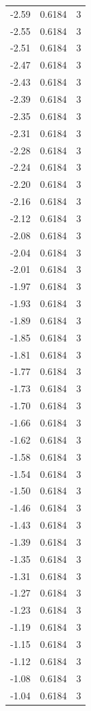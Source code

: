 \begin{longtable}{lrr}
  -2.59 & 0.6184 & 3 \\
  -2.55 & 0.6184 & 3 \\
  -2.51 & 0.6184 & 3 \\
  -2.47 & 0.6184 & 3 \\
  -2.43 & 0.6184 & 3 \\
  -2.39 & 0.6184 & 3 \\
  -2.35 & 0.6184 & 3 \\
  -2.31 & 0.6184 & 3 \\
  -2.28 & 0.6184 & 3 \\
  -2.24 & 0.6184 & 3 \\
  -2.20 & 0.6184 & 3 \\
  -2.16 & 0.6184 & 3 \\
  -2.12 & 0.6184 & 3 \\
  -2.08 & 0.6184 & 3 \\
  -2.04 & 0.6184 & 3 \\
  -2.01 & 0.6184 & 3 \\
  -1.97 & 0.6184 & 3 \\
  -1.93 & 0.6184 & 3 \\
  -1.89 & 0.6184 & 3 \\
  -1.85 & 0.6184 & 3 \\
  -1.81 & 0.6184 & 3 \\
  -1.77 & 0.6184 & 3 \\
  -1.73 & 0.6184 & 3 \\
  -1.70 & 0.6184 & 3 \\
  -1.66 & 0.6184 & 3 \\
  -1.62 & 0.6184 & 3 \\
  -1.58 & 0.6184 & 3 \\
  -1.54 & 0.6184 & 3 \\
  -1.50 & 0.6184 & 3 \\
  -1.46 & 0.6184 & 3 \\
  -1.43 & 0.6184 & 3 \\
  -1.39 & 0.6184 & 3 \\
  -1.35 & 0.6184 & 3 \\
  -1.31 & 0.6184 & 3 \\
  -1.27 & 0.6184 & 3 \\
  -1.23 & 0.6184 & 3 \\
  -1.19 & 0.6184 & 3 \\
  -1.15 & 0.6184 & 3 \\
  -1.12 & 0.6184 & 3 \\
  -1.08 & 0.6184 & 3 \\
  -1.04 & 0.6184 & 3 \\

\end{longtable}
